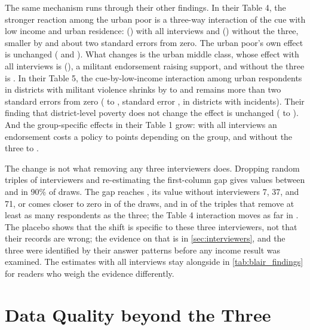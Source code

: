 \documentclass[11pt,letterpaper]{article}
\begin{document}
The same mechanism runs through their other findings. In their Table 4, the stronger reaction among the urban poor is a three-way interaction of the cue with low income and urban residence: \BlairUrbanGapFull{} (\BlairUrbanGapFullSE{}) with all interviews and \BlairUrbanGapWithout{} (\BlairUrbanGapWithoutSE{}) without the three, smaller by \BlairUrbanGapCut{} and about two standard errors from zero. The urban poor's own effect is unchanged (\BlairUrbanLowFull{} and \BlairUrbanLowWithout{}). What changes is the urban middle class, whose effect with all interviews is \BlairUrbanMiddleFull{} (\BlairUrbanMiddleFullSE{}), a militant endorsement raising support, and without the three is \BlairUrbanMiddleWithout{}. In their Table 5, the cue-by-low-income interaction among urban respondents in districts with militant violence shrinks by \BlairViolentCutMin{} to \BlairViolentCutMax{} and remains more than two standard errors from zero (\BlairViolentFull{} to \BlairViolentWithout{}, standard error \BlairViolentWithoutSE{}, in districts with incidents). Their finding that district-level poverty does not change the effect is unchanged (\BlairDistrictGapFull{} to \BlairDistrictGapWithout{}). And the group-specific effects in their Table 1 grow: with all interviews an endorsement costs a policy \BlairCueFullMin{} to \BlairCueFullMax{} points depending on the group, and without the three \BlairCueWithoutMin{} to \BlairCueWithoutMax{}.

The change is not what removing any three interviewers does. Dropping \BlairPlaceboDraws{} random triples of interviewers and re-estimating the first-column gap gives values between \BlairPlaceboGapLower{} and \BlairPlaceboGapUpper{} in 90\% of draws. The gap reaches \BlairGapWithout{}, its value without interviewers 7, 37, and 71, or comes closer to zero in \BlairPlaceboGapCount{} of the \BlairPlaceboDraws{} draws, and in \BlairPlaceboGapCountAsLarge{} of the \BlairPlaceboAsLargeCount{} triples that remove at least as many respondents as the three; the Table 4 interaction moves as far in \BlairPlaceboUrbanCount{}. The placebo shows that the shift is specific to these three interviewers, not that their records are wrong; the evidence on that is in \cref{sec:interviewers}, and the three were identified by their answer patterns before any income result was examined. The estimates with all interviews stay alongside in \cref{tab:blair_findings} for readers who weigh the evidence differently.

\section{Data Quality beyond the Three}
\label{sec:quality}
\end{document}
